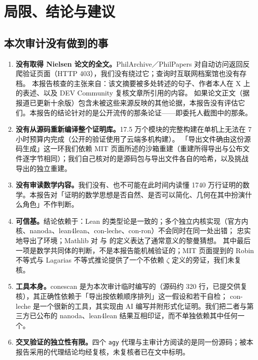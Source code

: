 \section{局限、结论与建议}
\label{sec:limits}

\subsection{本次审计没有做到的事}

\begin{enumerate}
\item \textbf{没有取得 Nielsen 论文的全文。}PhilArchive／PhilPapers 对自动访问返回反爬验证页面（HTTP 403），我们没有绕过它；查询时互联网档案馆也没有存档。
本报告核查的主张来自：该文摘要被多处转述的句子、作者本人在 X 上的表述、以及 DEV Community 复核文章所引用的内容。
如果论文正文（据报道已更新十余版）包含未被这些来源反映的其他论据，本报告没有评估它们。本报告的结论针对的是公开流传的那条论证——即委托人截图中的那条。
\item \textbf{没有从源码重新编译整个证明库。}17.5 万个模块的完整构建在单机上无法在 7 小时预算内完成（公开的验证使用了云端多机构建）。
「导出文件确由这份源码生成」这一环我们依赖 MIT 页面所述的沙箱重建（重建所得导出与公布文件逐字节相同）；我们自己核对的是源码包与导出文件各自的哈希，以及挑战导出的独立重建。
\item \textbf{没有审读数学内容。}我们没有、也不可能在此时间内读懂 1740 万行证明的数学。本报告对「证明的数学思想是否自然、是否可以简化、几何在其中扮演什么角色」不作判断。
\item \textbf{可信基。}结论依赖于：Lean 的类型论是一致的；多个独立内核实现（官方内核、nanoda、lean4lean、con-leche、con-ron）不会同时在同一处出错；
 忠实地导出了环境；Mathlib 对  与  的定义表达了通常意义的黎曼猜想。
其中最后一项是数学共同体的判断，不是本报告能机械验证的；MIT 页面提到的 Robin 不等式与 Lagarias 不等式推论提供了一个不依赖 $\zeta$ 定义的旁证，我们未复核。
\item \textbf{工具本身。}conescan 是为本次审计临时编写的（源码约 320 行，已提交供复核），其正确性依赖于「导出按依赖顺序排列」这一假设和若干自检；
con-leche 是一个很新的工具，其实现由 AI 编写并附形式化证明。我们把二者与第三方已公布的 nanoda、lean4lean 结果互相印证，而不单独依赖其中任何一个。
\item \textbf{交叉验证的独立性有限。}四个 \texttt{agy} 代理与主审计方阅读的是同一份源码；被本报告采用的代理结论均经复核，未复核者已在文中标明。
\end{enumerate}

